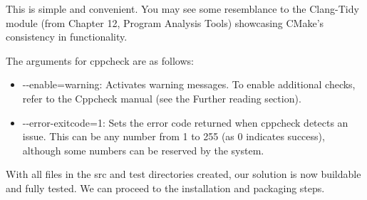 This is simple and convenient. You may see some resemblance to the Clang-Tidy module (from Chapter 12, Program Analysis Tools) showcasing CMake’s consistency in functionality.

The arguments for cppcheck are as follows:

\begin{itemize}
\item
-{}-enable=warning: Activates warning messages. To enable additional checks, refer to the Cppcheck manual (see the Further reading section).

\item
-{}-error-exitcode=1: Sets the error code returned when cppcheck detects an issue. This can be any number from 1 to 255 (as 0 indicates success), although some numbers can be reserved by the system.
\end{itemize}

With all files in the src and test directories created, our solution is now buildable and fully tested. We can proceed to the installation and packaging steps.

































